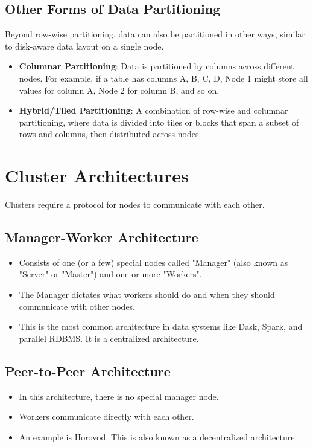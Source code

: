\documentclass{article}
\begin{document}
\subsection*{Other Forms of Data Partitioning}
Beyond row-wise partitioning, data can also be partitioned in other ways, similar to disk-aware data layout on a single node.
\begin{itemize}
    \item \textbf{Columnar Partitioning}: Data is partitioned by columns across different nodes. For example, if a table has columns A, B, C, D, Node 1 might store all values for column A, Node 2 for column B, and so on.
    \item \textbf{Hybrid/Tiled Partitioning}: A combination of row-wise and columnar partitioning, where data is divided into tiles or blocks that span a subset of rows and columns, then distributed across nodes.
\end{itemize}

\section*{Cluster Architectures}
Clusters require a protocol for nodes to communicate with each other.

\subsection*{Manager-Worker Architecture}
\begin{itemize}
    \item Consists of one (or a few) special nodes called "Manager" (also known as "Server" or "Master") and one or more "Workers".
    \item The Manager dictates what workers should do and when they should communicate with other nodes.
    \item This is the most common architecture in data systems like Dask, Spark, and parallel RDBMS. It is a centralized architecture.
\end{itemize}

\subsection*{Peer-to-Peer Architecture}
\begin{itemize}
    \item In this architecture, there is no special manager node.
    \item Workers communicate directly with each other.
    \item An example is Horovod. This is also known as a decentralized architecture.
\end{itemize}
\end{document}

